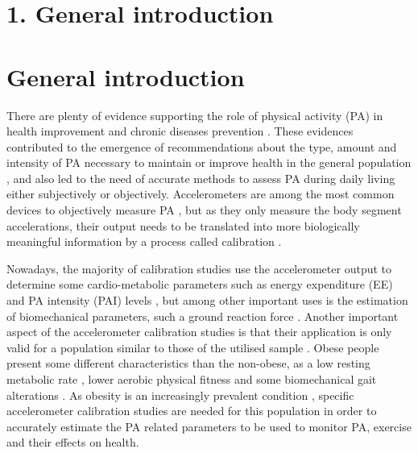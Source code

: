 \documentclass[12pt]{article}
\def\blankpage{%
      \clearpage%
      \thispagestyle{empty}%
      \addtocounter{page}{+0}%
      \null%
      \clearpage}
\begin{document}

\section*{\vfill\raggedleft\bfseries 1. General introduction}
\thispagestyle{empty} 
\blankpage


\section*{General introduction}

There are plenty of evidence supporting the role of physical activity (PA) in health improvement and chronic diseases prevention . These evidences contributed to the emergence of recommendations about the type, amount and intensity of PA necessary to maintain  or improve health in the general population , and also led to the need of accurate methods to assess PA during daily living  either subjectively or objectively. Accelerometers are among the most common devices to objectively measure PA , but as they only measure the body segment accelerations, their output needs to be translated into more biologically meaningful information by a process called calibration .
 
Nowadays, the majority of calibration studies use the accelerometer output to determine some cardio-metabolic parameters such as energy expenditure (EE) and PA intensity (PAI) levels , but among other important uses is the estimation of biomechanical parameters, such a ground reaction force . Another important aspect of the accelerometer calibration studies is that their application is only valid for a population similar to those of the utilised sample . Obese people present some different characteristics than the non-obese, as a low resting metabolic rate , lower aerobic physical fitness  and some biomechanical gait alterations . As obesity is an increasingly prevalent condition , specific accelerometer calibration studies are needed for this population in order to accurately estimate the PA related parameters to be used to monitor PA, exercise and their effects on health.
\end{document}
